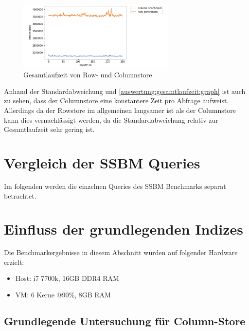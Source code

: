 \begin{figure}[H]
	\centering
	\includegraphics[width=0.7\textwidth]{images/performanceentwicklung.png}
	\caption{Gesamtlaufzeit von Row- und Columnstore}\label{auswertung:gesamtlaufzeit:graph}
\end{figure}
Anhand der Standardabweichung und \autoref{auswertung:gesamtlaufzeit:graph} ist auch zu sehen, dass der Columnstore
eine konstantere Zeit pro Abfrage aufweist.
Allerdings da der Rowstore im allgemeinen langsamer ist als der Columnstore
kann dies vernachlässigt werden, da die Standardabweichung relativ zur
Gesamtlaufzeit sehr gering ist.

\section{Vergleich der SSBM Queries}\label{auswertung:queries}

Im folgenden werden die einzelnen Queries des SSBM Benchmarks separat betrachtet.


\newpage
\section{Einfluss der grundlegenden Indizes}\label{auswertung:basic_indizes}
Die Benchmarkergebnisse in diesem Abschnitt wurden auf folgender Hardware erzielt:
\begin{itemize}
    \item Host: i7 7700k, 16GB DDR4 RAM
    \item VM: 6 Kerne @90\%, 8GB RAM
\end{itemize}

\subsection{Grundlegende Untersuchung für Column-Store}

